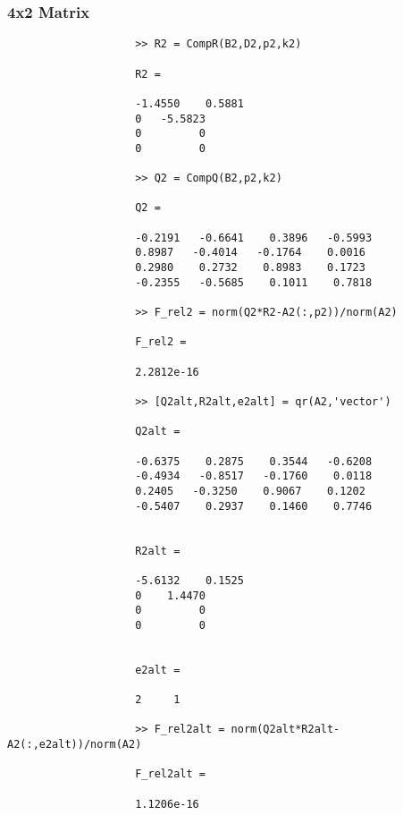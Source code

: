 \documentclass[11pt,titlepage]{article}
\begin{document}
			\subsubsection{4x2 Matrix}
				\begin{lstlisting}
					>> R2 = CompR(B2,D2,p2,k2)
					
					R2 =
					
					-1.4550    0.5881
					0   -5.5823
					0         0
					0         0
					
					>> Q2 = CompQ(B2,p2,k2)
					
					Q2 =
					
					-0.2191   -0.6641    0.3896   -0.5993
					0.8987   -0.4014   -0.1764    0.0016
					0.2980    0.2732    0.8983    0.1723
					-0.2355   -0.5685    0.1011    0.7818
					
					>> F_rel2 = norm(Q2*R2-A2(:,p2))/norm(A2)
					
					F_rel2 =
					
					2.2812e-16
					
					>> [Q2alt,R2alt,e2alt] = qr(A2,'vector')
					
					Q2alt =
					
					-0.6375    0.2875    0.3544   -0.6208
					-0.4934   -0.8517   -0.1760    0.0118
					0.2405   -0.3250    0.9067    0.1202
					-0.5407    0.2937    0.1460    0.7746
					
					
					R2alt =
					
					-5.6132    0.1525
					0    1.4470
					0         0
					0         0
					
					
					e2alt =
					
					2     1
					
					>> F_rel2alt = norm(Q2alt*R2alt-A2(:,e2alt))/norm(A2)
					
					F_rel2alt =
					
					1.1206e-16
				\end{lstlisting}
\end{document}
